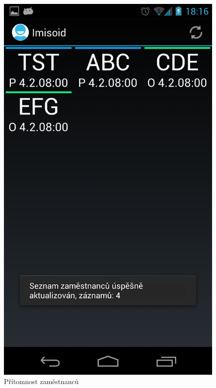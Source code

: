 \documentclass{diplomka}
\begin{document}
\begin{figure}[H]
\centering
\begin{minipage}{.45\textwidth}
  \centering
  \includegraphics[width=.9\linewidth]{scr/emps.png}
    \caption{Přítomnost zaměstnanců}
  \label{fig:emps}
\end{minipage}\hfill%
\begin{minipage}{.45\textwidth}
   \centering

\end{minipage}
\end{figure}
\end{document}
